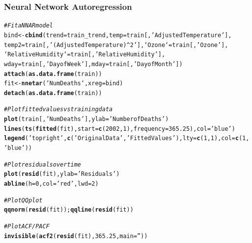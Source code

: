 \documentclass{article}\usepackage[]{graphicx}\usepackage[]{color}
\makeatletter
\newcommand{\hlnum}[1]{\textcolor[rgb]{0.686,0.059,0.569}{#1}}%
\newcommand{\hlstr}[1]{\textcolor[rgb]{0.192,0.494,0.8}{#1}}%
\newcommand{\hlcom}[1]{\textcolor[rgb]{0.678,0.584,0.686}{\textit{#1}}}%
\newcommand{\hlstd}[1]{\textcolor[rgb]{0.345,0.345,0.345}{#1}}%
\newcommand{\hlkwb}[1]{\textcolor[rgb]{0.69,0.353,0.396}{#1}}%
\newcommand{\hlkwc}[1]{\textcolor[rgb]{0.333,0.667,0.333}{#1}}%
\newcommand{\hlkwd}[1]{\textcolor[rgb]{0.737,0.353,0.396}{\textbf{#1}}}%
\newenvironment{kframe}{%
 \def\at@end@of@kframe{}%
 \ifinner\ifhmode%
  \def\at@end@of@kframe{\end{minipage}}%
  \begin{minipage}{\columnwidth}%
 \fi\fi%
 \def\FrameCommand##1{\hskip\@totalleftmargin \hskip-\fboxsep
 \colorbox{shadecolor}{##1}\hskip-\fboxsep
     \hskip-\linewidth \hskip-\@totalleftmargin \hskip\columnwidth}%
 \MakeFramed {\advance\hsize-\width
   \@totalleftmargin\z@ \linewidth\hsize
   \@setminipage}}%
 {\par\unskip\endMakeFramed%
 \at@end@of@kframe}
\newenvironment{knitrout}{}{} %
\makeatother
\begin{document}
\subsubsection*{Neural Network Autoregression}
\begin{knitrout}
\color{fgcolor}\begin{kframe}
\begin{alltt}
\hlcom{# Fit a NNAR model}
\hlstd{bind} \hlkwb{<-} \hlkwd{cbind}\hlstd{(}\hlkwc{trend}\hlstd{=train_trend,} \hlkwc{temp}\hlstd{=train[,} \hlstr{'Adjusted Temperature'}\hlstd{],}
  \hlkwc{temp2}\hlstd{=train[,} \hlstr{'(Adjusted Temperature)^2'}\hlstd{],} \hlkwc{`Ozone`}\hlstd{=train[,} \hlstr{'Ozone'}\hlstd{],}
  \hlkwc{`Relative Humidity`}\hlstd{=train[,} \hlstr{'Relative Humidity'}\hlstd{],}
  \hlkwc{wday}\hlstd{=train[,}\hlstr{'Day of Week'}\hlstd{],} \hlkwc{mday}\hlstd{=train[,}\hlstr{'Day of Month'}\hlstd{])}
\hlkwd{attach}\hlstd{(}\hlkwd{as.data.frame}\hlstd{(train))}
\hlstd{fit} \hlkwb{<-} \hlkwd{nnetar}\hlstd{(`Num Deaths`,} \hlkwc{xreg}\hlstd{=bind)}
\hlkwd{detach}\hlstd{(}\hlkwd{as.data.frame}\hlstd{(train))}

\hlcom{# Plot fitted values vs training data}
\hlkwd{plot}\hlstd{(train[,}\hlstr{'Num Deaths'}\hlstd{],} \hlkwc{ylab}\hlstd{=}\hlstr{'Number of Deaths'}\hlstd{)}
\hlkwd{lines}\hlstd{(}\hlkwd{ts}\hlstd{(}\hlkwd{fitted}\hlstd{(fit),} \hlkwc{start}\hlstd{=}\hlkwd{c}\hlstd{(}\hlnum{2002}\hlstd{,} \hlnum{1}\hlstd{),} \hlkwc{frequency}\hlstd{=}\hlnum{365.25}\hlstd{),} \hlkwc{col}\hlstd{=}\hlstr{'blue'}\hlstd{)}
\hlkwd{legend}\hlstd{(}\hlstr{'topright'}\hlstd{,} \hlkwd{c}\hlstd{(}\hlstr{'Original Data'}\hlstd{,} \hlstr{'Fitted Values'}\hlstd{),} \hlkwc{lty}\hlstd{=}\hlkwd{c}\hlstd{(}\hlnum{1}\hlstd{,}\hlnum{1}\hlstd{),} \hlkwc{col}\hlstd{=}\hlkwd{c}\hlstd{(}\hlnum{1}\hlstd{,}\hlstr{'blue'}\hlstd{))}

\hlcom{# Plot residuals over time}
\hlkwd{plot}\hlstd{(}\hlkwd{resid}\hlstd{(fit),} \hlkwc{ylab}\hlstd{=}\hlstr{'Residuals'}\hlstd{)}
\hlkwd{abline}\hlstd{(}\hlkwc{h}\hlstd{=}\hlnum{0}\hlstd{,} \hlkwc{col}\hlstd{=}\hlstr{'red'}\hlstd{,} \hlkwc{lwd}\hlstd{=}\hlnum{2}\hlstd{)}
\end{alltt}
\end{kframe}
\end{knitrout}
\begin{knitrout}
\color{fgcolor}\begin{kframe}
\begin{alltt}
\hlcom{# Plot QQ plot}
\hlkwd{qqnorm}\hlstd{(}\hlkwd{resid}\hlstd{(fit));} \hlkwd{qqline}\hlstd{(}\hlkwd{resid}\hlstd{(fit))}

\hlcom{# Plot ACF/PACF}
\hlkwd{invisible}\hlstd{(}\hlkwd{acf2}\hlstd{(}\hlkwd{resid}\hlstd{(fit),} \hlnum{365.25}\hlstd{,} \hlkwc{main}\hlstd{=}\hlstr{''}\hlstd{))}
\end{alltt}
\end{kframe}
\end{knitrout}
\end{document}

